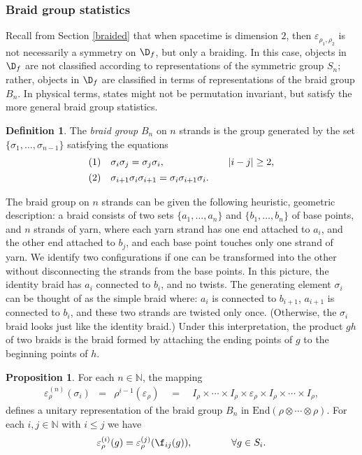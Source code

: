 \documentclass[11pt]{article}
\newcommand{\abs}[1]{|#1|}
\theoremstyle{definition}
\newtheorem{prop}[thm]{Proposition}
\theoremstyle{definition}
\newtheorem{defn}[thm]{Definition}
\theoremstyle{remark}
\newcommand{\ve}{\varepsilon}
\def\7#1{{\mathbb #1}}
\begin{document}
\subsubsection{Braid group statistics}

Recall from Section \ref{braided} that when spacetime
is dimension $2$, then $\ve _{\rho _1,\rho _2}$ is not
necessarily a symmetry on $\D _f$, but only a braiding.
In this case, objects in $\D _f$ are not classified
according to representations of the symmetric group
$S_n$; rather, objects in $\D _f$ are classified in
terms of representations of the braid group $B_n$.  In
physical terms, states might not be permutation
invariant, but satisfy the more general braid group
statistics.

\begin{defn} The \emph{braid group} $B_n$ on $n$
  strands is the group generated by the set $\{ \sigma
  _1,\dots ,\sigma _{n-1} \}$ satisfying the equations
  \[ \begin{array}{llll} (1) & \sigma _i\sigma _j =\sigma _j\sigma _i
    , & &
    \abs{i-j}\geq 2 ,\vspace{4pt} \\
    (2) & \sigma _{i+1}\sigma _i\sigma _{i+1} =\sigma _i\sigma
    _{i+1}\sigma _i .\end{array} \]
\end{defn}
The braid group on $n$ strands can be given the
following heuristic, geometric description: a braid
consists of two sets $\{ a_1,\dots ,a_n\}$ and $\{
b_1,\dots ,b_n\}$ of base points, and $n$ strands of
yarn, where each yarn strand has one end attached to
$a_i$, and the other end attached to $b_j$, and each
base point touches only one strand of yarn.  We
identify two configurations if one can be transformed
into the other without disconnecting the strands from
the base points.  In this picture, the identity braid
has $a_i$ connected to $b_i$, and no twists.  The
generating element $\sigma _i$ can be thought of as the
simple braid where: $a_i$ is connected to $b_{i+1}$,
$a_{i+1}$ is connected to $b_i$, and these two strands
are twisted only once.  (Otherwise, the $\sigma _i$
braid looks just like the identity braid.)  Under this
interpretation, the product $gh$ of two braids is the
braid formed by attaching the ending points of $g$ to
the beginning points of $h$.

\begin{prop} For each $n\in \7N$, the mapping
  \begin{eqnarray*} \ve ^{(n)}_{\rho}(\sigma _i) & = &
    \rho ^{i-1}(\ve _\rho) \quad =\quad I_\rho \times
    \cdots \times I_\rho \times \ve _{\rho} \times
    I_\rho \times \cdots \times
    I_{\rho},\end{eqnarray*} defines a unitary
  representation of the braid group $B_n$ in
  $\mathrm{End}\left( \rho \otimes \cdots \otimes \rho
  \right)$.  For each $i,j\in \7N$ with $i\leq j$ we
  have
$$ \ve ^{(i)}_{\rho}(g) =\ve ^{(j)}_{\rho}(\f _{ij}(g)) ,\qquad \qquad \forall g\in
S_i .$$ \label{thm-braid}
\end{prop}
\end{document}
